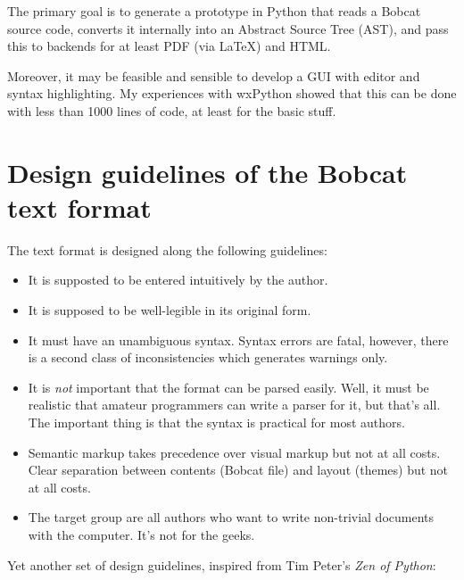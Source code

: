 \documentclass[12pt,openany]{book}
\begin{document}
The primary goal is to generate a prototype in Python that reads a Bobcat
source code, converts it internally into an Abstract Source Tree (AST), and
pass this to backends for at least PDF (via \LaTeX) and HTML\@.

Moreover, it may be feasible and sensible to develop a GUI with editor and
syntax highlighting.  My experiences with wxPython showed that this can be done
with less than 1000 lines of code, at least for the basic stuff.


\section{Design guidelines of the Bobcat text format}

The text format is designed along the following guidelines:

\begin{itemize}
\item It is supposted to be entered intuitively by the author.
\item It is supposed to be well-legible in its original form.
\item It must have an unambiguous syntax.  Syntax errors are fatal, however,
  there is a second class of inconsistencies which generates warnings only.
\item It is \emph{not} important that the format can be parsed easily.  Well,
  it must be realistic that amateur programmers can write a parser for it, but
  that's all.  The important thing is that the syntax is practical for most
  authors.
\item Semantic markup takes precedence over visual markup but not at all costs.
  Clear separation between contents (Bobcat file) and layout (themes) but not at
  all costs.
\item The target group are all authors who want to write non-trivial documents
  with the computer.  It's not for the geeks.
\end{itemize}

Yet another set of design guidelines, inspired from Tim Peter's \emph{Zen of Python}:
\end{document}
